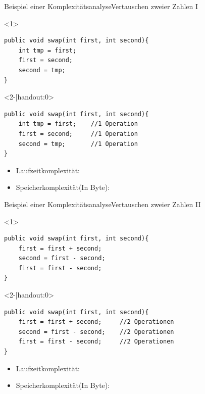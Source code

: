 \begin{frame}[fragile]{Beispiel einer Komplexitätsanalyse}{Vertauschen zweier Zahlen I}
\lstset{style=java}
\begin{onlyenv}<1>
\begin{lstlisting}
public void swap(int first, int second){
    int tmp = first;
    first = second;
    second = tmp;
}
\end{lstlisting}
\end{onlyenv}

\begin{onlyenv}<2-|handout:0>
\begin{lstlisting}
public void swap(int first, int second){
    int tmp = first;    //1 Operation
    first = second;     //1 Operation
    second = tmp;       //1 Operation
}
\end{lstlisting}
\end{onlyenv}

\begin{itemize}
    \item Laufzeitkomplexität: 
    \item<4-> Speicherkomplexität(In Byte): 
\end{itemize}
\end{frame}

\begin{frame}[fragile]{Beispiel einer Komplexitätsanalyse}{Vertauschen zweier Zahlen II}
\lstset{style=java}
\begin{onlyenv}<1>
\begin{lstlisting}
public void swap(int first, int second){
    first = first + second;
    second = first - second;
    first = first - second;
}
\end{lstlisting}
\end{onlyenv}
\begin{onlyenv}<2-|handout:0>
\begin{lstlisting}
public void swap(int first, int second){
    first = first + second;     //2 Operationen
    second = first - second;    //2 Operationen
    first = first - second;     //2 Operationen
}
\end{lstlisting}
\end{onlyenv}


\begin{itemize}
    \item Laufzeitkomplexität: 
    \item<4-> Speicherkomplexität(In Byte): 
\end{itemize}
\end{frame}

